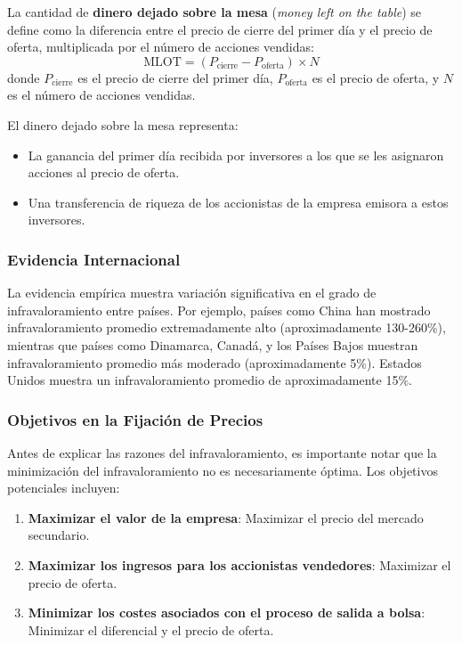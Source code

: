 \begin{definicion}
La cantidad de \textbf{dinero dejado sobre la mesa} (\textit{money left on the table}) se define como la diferencia entre el precio de cierre del primer día y el precio de oferta, multiplicada por el número de acciones vendidas:
\begin{equation}
\text{MLOT} = (P_{\text{cierre}} - P_{\text{oferta}}) \times N
\end{equation}
donde $P_{\text{cierre}}$ es el precio de cierre del primer día, $P_{\text{oferta}}$ es el precio de oferta, y $N$ es el número de acciones vendidas.
\end{definicion}

El dinero dejado sobre la mesa representa:
\begin{itemize}
\item La ganancia del primer día recibida por inversores a los que se les asignaron acciones al precio de oferta.
\item Una transferencia de riqueza de los accionistas de la empresa emisora a estos inversores.
\end{itemize}

\subsubsection{Evidencia Internacional}

La evidencia empírica muestra variación significativa en el grado de infravaloramiento entre países. Por ejemplo, países como China han mostrado infravaloramiento promedio extremadamente alto (aproximadamente 130-260\%), mientras que países como Dinamarca, Canadá, y los Países Bajos muestran infravaloramiento promedio más moderado (aproximadamente 5\%). Estados Unidos muestra un infravaloramiento promedio de aproximadamente 15\%.

\subsubsection{Objetivos en la Fijación de Precios}

Antes de explicar las razones del infravaloramiento, es importante notar que la minimización del infravaloramiento no es necesariamente óptima. Los objetivos potenciales incluyen:

\begin{enumerate}
\item \textbf{Maximizar el valor de la empresa}: Maximizar el precio del mercado secundario.
\item \textbf{Maximizar los ingresos para los accionistas vendedores}: Maximizar el precio de oferta.
\item \textbf{Minimizar los costes asociados con el proceso de salida a bolsa}: Minimizar el diferencial y el precio de oferta.
\end{enumerate}

